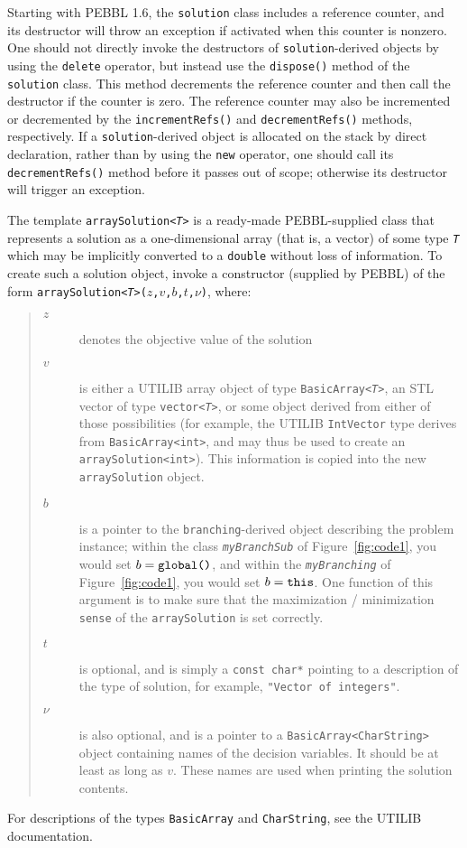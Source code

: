 Starting with PEBBL 1.6, the \texttt{solution} class includes a reference
counter, and its destructor will throw an exception if activated when this
counter is nonzero.  One should not directly invoke the destructors of
\texttt{solution}-derived objects by using the
\texttt{delete} operator, but instead use the \texttt{dispose()} method of the
\texttt{solution} class.  This method decrements the reference counter and then
call the destructor if the counter is zero.  The reference counter may also be
incremented or decremented by the \texttt{incrementRefs()} and
\texttt{decrementRefs()} methods, respectively.  If a
\texttt{solution}-derived object is allocated on the stack by direct
declaration, rather than by using the \texttt{new} operator, one should call
its \texttt{decrementRefs()} method before it passes out of scope; otherwise
its destructor will trigger an exception.

The template \texttt{arraySolution<\emph{T}>} is a ready-made PEBBL-supplied
class that represents a solution as a one-dimensional array (that is,
a vector) of some type \texttt{\emph{T}} which may be implicitly converted to
a \texttt{double} without loss of information.  To create such a
solution object, invoke a constructor (supplied by PEBBL) of the form
\texttt{arraySolution<\emph{T}>($z$,$v$,$b$,$t$,$\nu$)}, where:
\begin{quote}
\begin{description}
\item[$z$] denotes the objective value of the solution 
\item[$v$] is either a UTILIB array object of type
  \texttt{BasicArray<\emph{T}>}, an STL vector of type 
  \texttt{vector<\emph{T}>}, or
  some object derived from either of those possibilities (for example,
  the UTILIB \texttt{IntVector} type derives from
  \texttt{BasicArray<int>}, and may thus be used to create an
  \texttt{arraySolution<int>}).  This information is copied into the
  new \texttt{arraySolution} object.
\item[$b$] is a pointer
  to the \texttt{branching}-derived object describing the 
  problem instance; within the class \texttt{\emph{myBranchSub}} of
  Figure~\ref{fig:code1}, you would set $b =
  \text{\texttt{global()}}$, and within the
  \texttt{\emph{myBranching}} of Figure~\ref{fig:code1}, you would set
  $b = \text{\texttt{this}}$.  One function of this argument is to
  make sure that the maximization / minimization \texttt{sense} of the
  \texttt{arraySolution} is set correctly.
\item[$t$] is optional, and is simply a \texttt{const char*} pointing to a
  description of the type of solution, for example, \texttt{"Vector
    of integers"}. 
\item[$\nu$] is also optional, and is a pointer to a
  \texttt{BasicArray<CharString>} object containing names of the
  decision variables.  It should be at least as long as $v$.  These
  names are used when printing the solution contents.  
\end{description}
\end{quote}
For descriptions of the types \texttt{BasicArray} and
\texttt{CharString}, see the UTILIB documentation.

